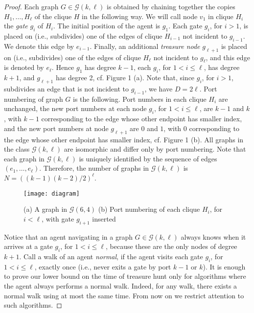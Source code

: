 \documentclass{llncs}
\newcommand{\classletter}{\ensuremath{\mathcal{G}}}
\newcommand{\ourclass}{\ensuremath{\classletter (k,\ell)}}
\newcommand{\treasure}{\ensuremath{g_{\ell+1}}}
\begin{document}
\begin{proof}
Each graph $G \in \ourclass$ is obtained by chaining together the copies $H_1,\ldots,H_\ell$ of the clique $H$ in the following way. We will call node $v_1$ in clique $H_i$ the \emph{gate} $g_i$ of $H_i$. The initial position of the agent is $g_1$. Each gate $g_i$, for $i > 1$, is placed on (i.e., subdivides) one of the edges of clique $H_{i-1}$ not incident to $g_{i-1}$. We denote this edge by $e_{i-1}$. Finally, an additional \emph{treasure node} $\treasure$ is placed on  (i.e., subdivides) one of the edges of clique $H_\ell$ not incident to $g_{\ell}$, and this edge is denoted by $e_\ell$.
Hence $g_1$ has degree $k-1$, each $g_i$, for $1<i\leq \ell$, has degree $k+1$, and $g_{\ell +1}$ has degree 2, cf. Figure 1 (a).
Note that, since $g_i$, for $i > 1$, subdivides an edge that is not incident to $g_{i-1}$, we have $D=2\ell$.  
Port numbering of graph $G$ is the following. Port numbers in each clique $H_{i}$ are
unchanged, the new port numbers at each node $g_{i}$, for $1< i  \leq \ell$, are $k-1$ and $k$, with $k-1$ corresponding to the edge whose other endpoint has smaller index,
and the new port numbers at node $g_{\ell +1}$ are $0$ and $1$, with $0$ corresponding to the edge whose other endpoint has smaller index,
cf. Figure 1 (b).
All graphs in the class $\ourclass$ are isomorphic and differ only by port numbering. 
Note that each graph in $\ourclass$ is uniquely identified by the sequence of edges $(e_1,\ldots,e_\ell)$. Therefore, the number of graphs in $\ourclass$ is 
$N = ((k-1)(k-2)/2)^\ell$.


\begin{figure}[!ht]
\begin{center}
\texttt{[image: diagram]}
\end{center}
\caption{(a) A graph in $\classletter (6,4)$ (b) Port numbering of each clique $H_i$, for $i<\ell$, with gate $g_{i+1}$ inserted }
\label{GraphDiagrams}
\end{figure}


Notice that an agent navigating in a graph $G \in \ourclass$  always knows when it arrives at a gate $g_i$, for $1<i\leq \ell$, because these are the only nodes of degree
$k+1$. Call a walk of an agent {\em normal}, if the agent visits each gate $g_i$, for $1<i\leq \ell$, exactly once (i.e., never exits a gate by port $k-1$ or $k$).
It is enough to prove our lower bound on the time of treasure hunt only for algorithms where the agent always performs a normal walk. Indeed,  for any walk, there exists a normal walk using at most the same time. From now on we restrict attention to such algorithms.



\end{proof}
\end{document}
